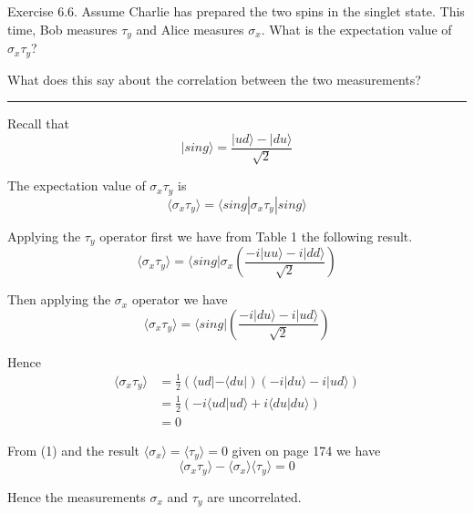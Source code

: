 \documentclass[12pt]{article}
\begin{document}
Exercise 6.6.
Assume Charlie has prepared the two spins in the singlet state.
This time, Bob measures $\tau_y$ and Alice measures $\sigma_x$.
What is the expectation value of $\sigma_x\tau_y$?

\bigskip
What does this say about the correlation between the two measurements?

\bigskip
\hrule

\bigskip
Recall that
\begin{equation*}
|sing\rangle=\frac{|ud\rangle-|du\rangle}{\sqrt2}
\end{equation*}

The expectation value of $\sigma_x\tau_y$ is
\begin{equation*}
\langle\sigma_x\tau_y\rangle=\langle sing|\sigma_x\tau_y|sing\rangle
\end{equation*}

Applying the $\tau_y$ operator first we have from Table 1 the following result.
\begin{equation*}
\langle\sigma_x\tau_y\rangle=\langle sing|\sigma_x
\left(\frac{-i|uu\rangle-i|dd\rangle}{\sqrt2}\right)
\end{equation*}

Then applying the $\sigma_x$ operator we have
\begin{equation*}
\langle\sigma_x\tau_y\rangle=\langle sing|\left(\frac{-i|du\rangle-i|ud\rangle}{\sqrt2}\right)
\end{equation*}

Hence
\begin{align*}
\langle\sigma_x\tau_y\rangle
&=\frac{1}{2}
\left(\langle ud|-\langle du|\right)
\left(-i|du\rangle-i|ud\rangle\right)
\\[1ex]
&=\frac{1}{2}\left(-i\langle ud|ud\rangle+i\langle du|du\rangle\right)
\\[1ex]
&=0\tag{1}
\end{align*}

From (1) and the result $\langle\sigma_x\rangle=\langle\tau_y\rangle=0$ given on page 174 we have
\begin{equation*}
\langle\sigma_x\tau_y\rangle-\langle\sigma_x\rangle\langle\tau_y\rangle=0
\end{equation*}

Hence the measurements $\sigma_x$ and $\tau_y$ are uncorrelated.
\end{document}
